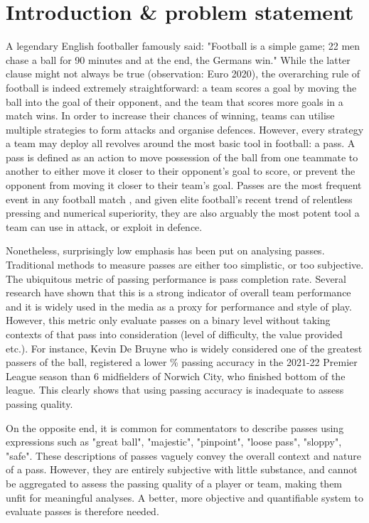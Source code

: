 \documentclass[conference]{IEEEtran}
\begin{document}
\section{Introduction \& problem statement}
A legendary English footballer famously said: "Football is a simple game; 22 men chase a ball for 90 minutes and at the end, the Germans win." While the latter clause might not always be true (observation: Euro 2020), the overarching rule of football is indeed extremely straightforward: a team scores a goal by moving the ball into the goal of their opponent, and the team that scores more goals in a match wins. In order to increase their chances of winning, teams can utilise multiple strategies to form attacks and organise defences. However, every strategy a team may deploy all revolves around the most basic tool in football: a pass. A pass is defined as an action to move possession of the ball from one teammate to another to either move it closer to their opponent's goal to score, or prevent the opponent from moving it closer to their team's goal. Passes are the most frequent event in any football match \parencite{goespassassist, riskrewardpower}, and given elite football's recent trend of relentless pressing and numerical superiority, they are also arguably the most potent tool a team can use in attack, or exploit in defence.

Nonetheless, surprisingly low emphasis has been put on analysing passes. Traditional methods to measure passes are either too simplistic, or too subjective. The ubiquitous metric of passing performance is pass completion rate. Several research have shown that this is a strong indicator of overall team performance \parencite{bradley, krol} and it is widely used in the media as a proxy for performance and style of play. However, this metric only evaluate passes on a binary level without taking contexts of that pass into consideration (level of difficulty, the value provided etc.). For instance, Kevin De Bruyne who is widely considered one of the greatest passers of the ball, registered a lower \% passing accuracy in the 2021-22 Premier League season than 6 midfielders of Norwich City, who finished bottom of the league. This clearly shows that using passing accuracy is inadequate to assess passing quality. 

On the opposite end, it is common for commentators to describe passes using expressions such as "great ball", "majestic", "pinpoint", "loose pass", "sloppy", "safe". These descriptions of passes vaguely convey the overall context and nature of a pass. However, they are entirely subjective with little substance, and cannot be aggregated to assess the passing quality of a player or team, making them unfit for meaningful analyses. A better, more objective and quantifiable system to evaluate passes is therefore needed.
\end{document}
